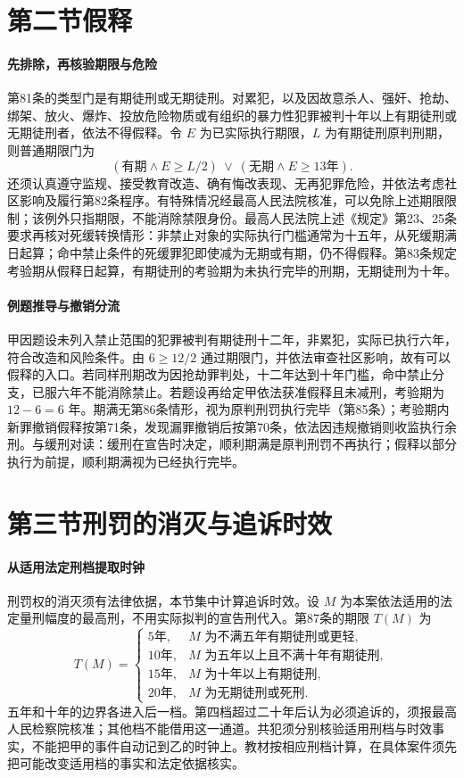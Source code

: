 \section{第二节\quad 假释}
\paragraph{先排除，再核验期限与危险}
第81条的类型门是有期徒刑或无期徒刑。对累犯，以及因故意杀人、强奸、抢劫、绑架、放火、爆炸、投放危险物质或有组织的暴力性犯罪被判十年以上有期徒刑或无期徒刑者，依法不得假释。令 \(E\) 为已实际执行期限，\(L\) 为有期徒刑原判刑期，则普通期限门为
\[
 (\text{有期}\land E\ge L/2)\ \lor\
 (\text{无期}\land E\ge 13\text{年}).
\]
还须认真遵守监规、接受教育改造、确有悔改表现、无再犯罪危险，并依法考虑社区影响及履行第82条程序。有特殊情况经最高人民法院核准，可以免除上述期限限制；该例外只指期限，不能消除禁限身份。最高人民法院上述《规定》第23、25条要求再核对死缓转换情形：非禁止对象的实际执行门槛通常为十五年，从死缓期满日起算；命中禁止条件的死缓罪犯即使减为无期或有期，仍不得假释。第83条规定考验期从假释日起算，有期徒刑的考验期为未执行完毕的刑期，无期徒刑为十年。

\paragraph{例题推导与撤销分流}
甲因题设未列入禁止范围的犯罪被判有期徒刑十二年，非累犯，实际已执行六年，符合改造和风险条件。由 \(6\ge 12/2\) 通过期限门，并依法审查社区影响，故有可以假释的入口。若同样刑期改为因抢劫罪判处，十二年达到十年门槛，命中禁止分支，已服六年不能消除禁止。若题设再给定甲依法获准假释且未减刑，考验期为 \(12-6=6\) 年。期满无第86条情形，视为原判刑罚执行完毕（第85条）；考验期内新罪撤销假释按第71条，发现漏罪撤销后按第70条，依法因违规撤销则收监执行余刑。与缓刑对读：缓刑在宣告时决定，顺利期满是原判刑罚不再执行；假释以部分执行为前提，顺利期满视为已经执行完毕。

\section{第三节\quad 刑罚的消灭与追诉时效}
\paragraph{从适用法定刑档提取时钟}
刑罚权的消灭须有法律依据，本节集中计算追诉时效。设 \(M\) 为本案依法适用的法定量刑幅度的最高刑，不用实际拟判的宣告刑代入。第87条的期限 \(T(M)\) 为
\[
 T(M)=
 \begin{cases}
 5\text{年},&M\text{ 为不满五年有期徒刑或更轻},\\
 10\text{年},&M\text{ 为五年以上且不满十年有期徒刑},\\
 15\text{年},&M\text{ 为十年以上有期徒刑},\\
 20\text{年},&M\text{ 为无期徒刑或死刑}.
 \end{cases}
\]
五年和十年的边界各进入后一档。第四档超过二十年后认为必须追诉的，须报最高人民检察院核准；其他档不能借用这一通道。共犯须分别核验适用刑档与时效事实，不能把甲的事件自动记到乙的时钟上。教材按相应刑档计算，在具体案件须先把可能改变适用档的事实和法定依据核实。

